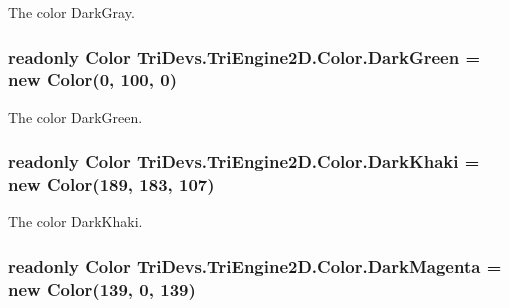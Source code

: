 The color Dark\-Gray. 

\hypertarget{struct_tri_devs_1_1_tri_engine2_d_1_1_color_a70216aff6643befb044853af65fa1280}{
\subsubsection[{Dark\-Green}]{\setlength{\rightskip}{0pt plus 5cm}readonly {\bf Color} Tri\-Devs.\-Tri\-Engine2\-D.\-Color.\-Dark\-Green = new {\bf Color}(0, 100, 0)\hspace{0.3cm}{\ttfamily [static]}}}\label{struct_tri_devs_1_1_tri_engine2_d_1_1_color_a70216aff6643befb044853af65fa1280}


The color Dark\-Green. 

\hypertarget{struct_tri_devs_1_1_tri_engine2_d_1_1_color_ae12d4b85870751487169824ff99676bc}{
\subsubsection[{Dark\-Khaki}]{\setlength{\rightskip}{0pt plus 5cm}readonly {\bf Color} Tri\-Devs.\-Tri\-Engine2\-D.\-Color.\-Dark\-Khaki = new {\bf Color}(189, 183, 107)\hspace{0.3cm}{\ttfamily [static]}}}\label{struct_tri_devs_1_1_tri_engine2_d_1_1_color_ae12d4b85870751487169824ff99676bc}


The color Dark\-Khaki. 

\hypertarget{struct_tri_devs_1_1_tri_engine2_d_1_1_color_a8eccd0d13ae59ae20287a2907edef992}{
\subsubsection[{Dark\-Magenta}]{\setlength{\rightskip}{0pt plus 5cm}readonly {\bf Color} Tri\-Devs.\-Tri\-Engine2\-D.\-Color.\-Dark\-Magenta = new {\bf Color}(139, 0, 139)\hspace{0.3cm}{\ttfamily [static]}}}\label{struct_tri_devs_1_1_tri_engine2_d_1_1_color_a8eccd0d13ae59ae20287a2907edef992}


